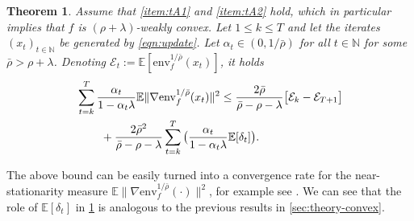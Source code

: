 \documentclass{article}
\newcommand{\prox}[1]{\mathrm{prox}_{#1}}
\newcommand{\env}[1]{\mathrm{env}_{#1}}
\newcommand{\R}{\mathbb{R}}
\newcommand{\N}{\mathbb{N}}
\newcommand{\E}{\mathbb{E}}
\theoremstyle{plain}
\newtheorem{theorem}{Theorem}[section]
\newtheorem{lemma}[theorem]{Lemma}
\theoremstyle{definition}
\theoremstyle{remark}
\begin{document}
%
\begin{theorem}\label{thm:weakly-convex}
    Assume that \ref{item:tA1} and \ref{item:tA2} hold, which in particular implies that $f$ is $(\rho+\lambda)$-weakly convex. Let $1\leq k \leq T$ and let the iterates $(x_t)_{t\in \N}$ be generated by \eqref{eqn:update}. Let $\alpha_t \in (0, 1/\bar{\rho})$ for all $t\in \N$ for some $\bar{\rho} > \rho + \lambda$. Denoting $\mathcal{E}_t:= \E[\env{f}^{1/\bar{\rho}}(x_t)]$, it holds
    \begin{align*}
        &\sum_{t=k}^{T} \frac{\alpha_t}{1-\alpha_t\lambda} \E\|\nabla \env{f}^{1/\bar{\rho}}(x_t)\|^2 \leq \frac{2\bar{\rho}}{\bar{\rho}-\rho-\lambda} \big[\mathcal{E}_k - \mathcal{E}_{T+1}\big] \\
        &\hspace{5ex}+ \frac{2\bar{\rho}^2}{\bar{\rho}-\rho-\lambda}\sum_{t=k}^{T}\big(\frac{\alpha_t}{1-\alpha_t \lambda} \E[\delta_t]\big).
    \end{align*}
\end{theorem}
%
The above bound can be easily turned into a convergence rate for the near-stationarity measure $\E\|\nabla \env{f}^{1/\bar{\rho}}(\cdot)\|^2$, for example see \citep[Thm.\ 4.3]{Davis2019}. We can see that the role of $\E[\delta_t]$ in \cref{thm:weakly-convex} is analogous to the  previous results in \cref{sec:theory-convex}.
%
\end{document}
